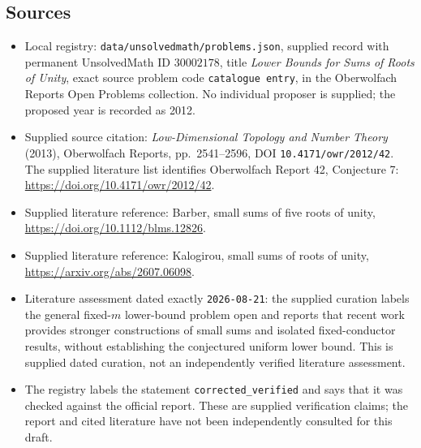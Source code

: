 \documentclass[11pt]{article}
\begin{document}
\subsection{Sources}
\begin{itemize}
\item Local registry: \texttt{data/unsolvedmath/problems.json}, supplied record with permanent UnsolvedMath ID \(30002178\), title \emph{Lower Bounds for Sums of Roots of Unity}, exact source problem code \texttt{catalogue entry}, in the Oberwolfach Reports Open Problems collection. No individual proposer is supplied; the proposed year is recorded as 2012.
\item Supplied source citation: \emph{Low-Dimensional Topology and Number Theory} (2013), Oberwolfach Reports, pp.\ 2541--2596, DOI \texttt{10.4171/owr/2012/42}. The supplied literature list identifies Oberwolfach Report 42, Conjecture 7: \url{https://doi.org/10.4171/owr/2012/42}.
\item Supplied literature reference: Barber, small sums of five roots of unity, \url{https://doi.org/10.1112/blms.12826}.
\item Supplied literature reference: Kalogirou, small sums of roots of unity, \url{https://arxiv.org/abs/2607.06098}.
\item Literature assessment dated exactly \texttt{2026-08-21}: the supplied curation labels the general fixed-\(m\) lower-bound problem open and reports that recent work provides stronger constructions of small sums and isolated fixed-conductor results, without establishing the conjectured uniform lower bound. This is supplied dated curation, not an independently verified literature assessment.
\item The registry labels the statement \texttt{corrected\_verified} and says that it was checked against the official report. These are supplied verification claims; the report and cited literature have not been independently consulted for this draft.
\end{itemize}
\end{document}

